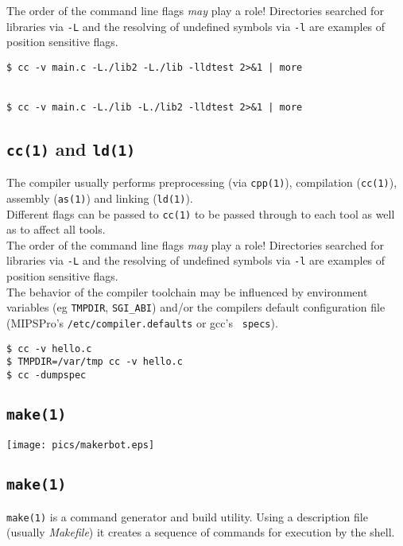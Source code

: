 \documentclass[xga]{xdvislides}
\begin{document}
The order of the command line flags {\em may} play a role!
Directories searched for libraries via {\tt -L} and the resolving of undefined
symbols via {\tt -l} are examples of position sensitive flags.
\\

\begin{verbatim}
$ cc -v main.c -L./lib2 -L./lib -lldtest 2>&1 | more


$ cc -v main.c -L./lib -L./lib2 -lldtest 2>&1 | more
\end{verbatim}


\subsection{{\tt cc(1)} and {\tt ld(1)}}

The compiler usually performs preprocessing (via {\tt cpp(1)}), compilation
({\tt cc(1)}), assembly ({\tt as(1)}) and linking ({\tt ld(1)}).
\\

Different flags can be passed to {\tt cc(1)} to be passed through to each tool
as well as to affect all tools.  \\

The order of the command line flags {\em may} play a role!
Directories searched for libraries via {\tt -L} and the resolving of undefined
symbols via {\tt -l} are examples of position sensitive flags.
\\

The behavior of the compiler toolchain may be influenced by environment
variables (eg {\tt TMPDIR}, {\tt SGI\_ABI}) and/or the compilers default
configuration file (MIPSPro's {\tt /etc/compiler.defaults} or gcc's {\tt
specs}).

\begin{verbatim}
$ cc -v hello.c
$ TMPDIR=/var/tmp cc -v hello.c
$ cc -dumpspec
\end{verbatim}

\subsection{{\tt make(1)}}

\begin{center}
	\texttt{[image: pics/makerbot.eps]}
\end{center}

\subsection{{\tt make(1)}}
{\tt make(1)} is a command generator and build utility. Using a
description file (usually {\em Makefile}) it creates a sequence of
commands for execution by the shell.
\end{document}
